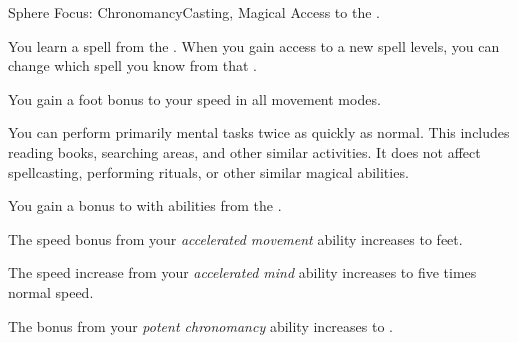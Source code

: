     \begin{feat}{Sphere Focus: Chronomancy}{Casting, Magical}
        \featpre Access to the  .

         You learn a spell from the  .
        When you gain access to a new spell levels, you can change which spell you know from that .

         You gain a  foot bonus to your speed in all movement modes.

         You can perform primarily mental tasks twice as quickly as normal.
        This includes reading books, searching areas, and other similar activities.
        It does not affect spellcasting, performing rituals, or other similar magical abilities.

         You gain a  bonus to  with abilities from the  . 

         The speed bonus from your \textit{accelerated movement} ability increases to  feet.

         The speed increase from your \textit{accelerated mind} ability increases to five times normal speed.

         The bonus from your \textit{potent chronomancy} ability increases to .
    \end{feat}

